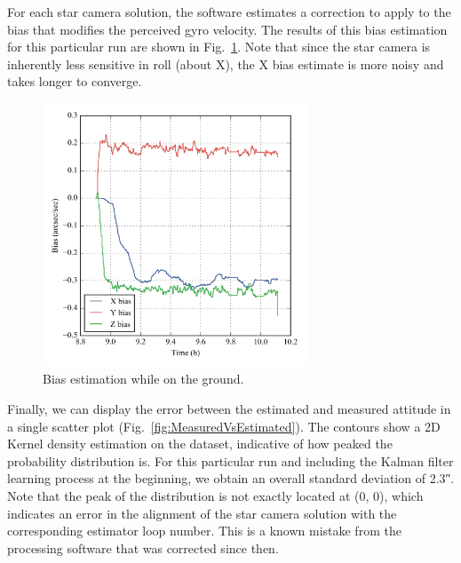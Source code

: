 For each star camera solution, the software estimates a correction to apply to the bias that modifies the perceived gyro velocity. The results of this bias estimation for this particular run are shown in Fig.~\ref{fig:BiasEstimate}. Note that since the star camera is inherently less sensitive in roll (about X), the X bias estimate is more noisy and takes longer to converge. 
\begin{figure}[!h]
\begin{center}
\includegraphics[width=0.7\textwidth]{Figures/bias_estimate.png}
\caption[Bias estimation while on the ground]{Bias estimation while on the ground.}
\label{fig:BiasEstimate}
\end{center}
\end{figure}

Finally, we can display the error between the estimated and measured attitude in a single scatter plot (Fig.~\ref{fig:MeasuredVsEstimated}). The contours show a 2D Kernel density estimation on the dataset, indicative of how peaked the probability distribution is. For this particular run and including the Kalman filter learning process at the beginning, we obtain an overall standard deviation of \ang{;;2.3}. Note that the peak of the distribution is not exactly located at (0, 0), which indicates an error in the alignment of the star camera solution with the corresponding estimator loop number. This is a known mistake from the processing software that was corrected since then.

